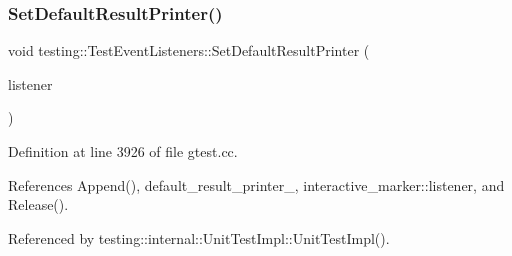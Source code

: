 \subsubsection{\texorpdfstring{Set\+Default\+Result\+Printer()}{SetDefaultResultPrinter()}}
{\footnotesize\ttfamily void testing\+::\+Test\+Event\+Listeners\+::\+Set\+Default\+Result\+Printer (\begin{DoxyParamCaption}\item[{\hyperlink{classtesting_1_1TestEventListener}{Test\+Event\+Listener} $\ast$}]{listener }\end{DoxyParamCaption})\hspace{0.3cm}{\ttfamily [private]}}



Definition at line 3926 of file gtest.\+cc.



References Append(), default\+\_\+result\+\_\+printer\+\_\+, interactive\+\_\+marker\+::listener, and Release().



Referenced by testing\+::internal\+::\+Unit\+Test\+Impl\+::\+Unit\+Test\+Impl().


